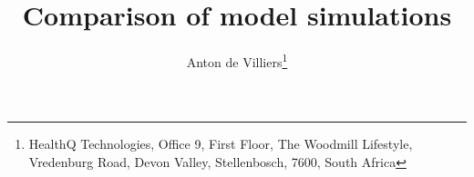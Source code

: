 \documentclass[10pt]{article}
\title{Comparison of model simulations}
\author{Anton de Villiers\thanks{HealthQ Technologies, Office 9, First Floor, The Woodmill Lifestyle, Vredenburg Road, Devon Valley,
Stellenbosch, 7600, South Africa}}
\begin{document}
\setcounter{page}{1}



\newcommand{\blokkie}{\hspace{.07cm}\Box\hspace{.07cm}}

\newcommand{\headcol}{\rowcolor{tableheadcolor}}
\newcommand{\rowcol}{\rowcolor{tablerowcolor}}

\newcommand{\topline}{\arrayrulecolor{black}\specialrule{0.1em}{\abovetopsep}{0pt}%
	\arrayrulecolor{tableheadcolor}\specialrule{\belowrulesep}{0pt}{0pt}%
	\arrayrulecolor{black}}

\newcommand{\toplinee}{\arrayrulecolor{black}\specialrule{0.1em}{\abovetopsep}{0pt}%
	\arrayrulecolor{tablerowcolor}\specialrule{\belowrulesep}{0pt}{0pt}%
	\arrayrulecolor{black}}

\newcommand{\midline}{\arrayrulecolor{tableheadcolor}\specialrule{\aboverulesep}{0pt}{0pt}%
	\arrayrulecolor{black}\specialrule{\lightrulewidth}{0pt}{0pt}%
	\arrayrulecolor{white}\specialrule{\belowrulesep}{0pt}{0pt}%
	\arrayrulecolor{black}}

\newcommand{\midlinecbw}{\arrayrulecolor{tablerowcolor}\specialrule{\aboverulesep}{0pt}{0pt}%
	\arrayrulecolor{black}\specialrule{\lightrulewidth}{0pt}{0pt}%
 	\arrayrulecolor{white}\specialrule{\belowrulesep}{0pt}{0pt}%
	\arrayrulecolor{black}}

\newcommand{\midlinecw}{\arrayrulecolor{tablerowcolor}\specialrule{\aboverulesep}{0pt}{0pt}%
	\arrayrulecolor{tablerowcolor}\specialrule{\lightrulewidth}{0pt}{0pt}%
	\arrayrulecolor{white}\specialrule{\belowrulesep}{0pt}{0pt}%
	\arrayrulecolor{black}}

\newcommand{\midlinewbc}{\arrayrulecolor{white}\specialrule{\aboverulesep}{0pt}{0pt}%
	\arrayrulecolor{black}\specialrule{\lightrulewidth}{0pt}{0pt}%
	\arrayrulecolor{tablerowcolor}\specialrule{\belowrulesep}{0pt}{0pt}%
	\arrayrulecolor{black}}

\newcommand{\midlinehr}{\arrayrulecolor{tablerowcolor}\specialrule{\aboverulesep}{0pt}{0pt}%
	\arrayrulecolor{black}\specialrule{\lightrulewidth}{0pt}{0pt}%
	\arrayrulecolor{tableheadcolor}\specialrule{\belowrulesep}{0pt}{0pt}%
	\arrayrulecolor{tablerowcolor}}
\end{document}
